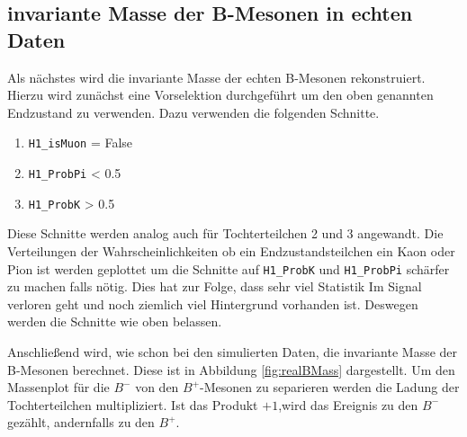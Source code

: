 \subsection{invariante Masse der B-Mesonen in echten Daten}
Als n\"achstes wird die invariante Masse der echten B-Mesonen rekonstruiert.
Hierzu wird zun\"achst eine Vorselektion durchgef\"uhrt um den oben genannten Endzustand zu verwenden.
Dazu verwenden die folgenden Schnitte.
\begin{enumerate}
  \item \texttt{H1\_isMuon} = False
  \item \texttt{H1\_ProbPi} < 0.5
  \item \texttt{H1\_ProbK} > 0.5
\end{enumerate}

Diese Schnitte werden analog auch f\"ur Tochterteilchen 2 und 3 angewandt.
Die Verteilungen der Wahrscheinlichkeiten ob ein Endzustandsteilchen ein Kaon oder Pion ist werden geplottet um die Schnitte auf \texttt{H1\_ProbK} und \texttt{H1\_ProbPi} sch\"arfer zu machen falls nötig.
Dies hat zur Folge, dass sehr viel Statistik Im Signal verloren geht und noch ziemlich viel Hintergrund vorhanden ist. Deswegen werden die Schnitte wie oben belassen.

Anschlie\ss end wird, wie schon bei den simulierten Daten, die invariante Masse der B-Mesonen berechnet. Diese ist in Abbildung \ref{fig:realBMass} dargestellt. Um den Massenplot f\"ur die $B^{-}$ von den $B^{+}$-Mesonen zu separieren werden die Ladung der Tochterteilchen multipliziert. Ist das Produkt $+1$,wird das Ereignis zu den $B^{-}$ gez\"ahlt, andernfalls zu den $B^{+}$.
